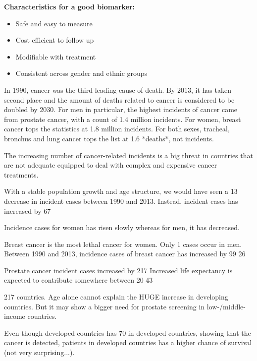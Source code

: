 \documentclass[UKenglish,11pt,a4paper]{article}
\begin{document}
\textbf{Characteristics for a good biomarker:}
\begin{itemize}
    \item Safe and easy to measure
    \item Cost efficient to follow up
    \item Modifiable with treatment
    \item Consistent across gender and ethnic groups
\end{itemize}

In 1990, cancer was the third leading cause of death. By 2013, it has taken
second place and the amount of deaths related to cancer is considered to be
doubled by 2030. For men in particular, the highest incidents of cancer came
from prostate cancer, with a count of 1.4 million incidents. For women, breast
cancer tops the statistics at 1.8 million incidents. For both sexes, tracheal,
bronchus and lung cancer tops the list at 1.6 *deaths*, not incidents.

The increasing number of cancer-related incidents is a big threat in countries
that are not adequate equipped to deal with complex and expensive cancer
treatments.

With a stable population growth and age structure, we would have seen a 13%
decrease in incident cases between 1990 and 2013. Instead, incident cases has
increased by 67%

Incidence cases for women has risen slowly whereas for men, it has decreased.

Breast cancer is the most lethal cancer for women. Only 1%
cases occur in men. Between 1990 and 2013, incidence cases of breast cancer has
increased by 99%
26%

Prostate cancer incident cases increased by 217%
Increased life expectancy is expected to contribute somewhere between 20%
43%

217%
countries. Age alone cannot explain the HUGE increase in developing countries.
But it may show a bigger need for prostate screening in low-/middle-income
countries.

Even though developed countries has 70%
in developed countries, showing that the cancer is detected, patients in
developed countries has a higher chance of survival (not very surprising...).
\end{document}
